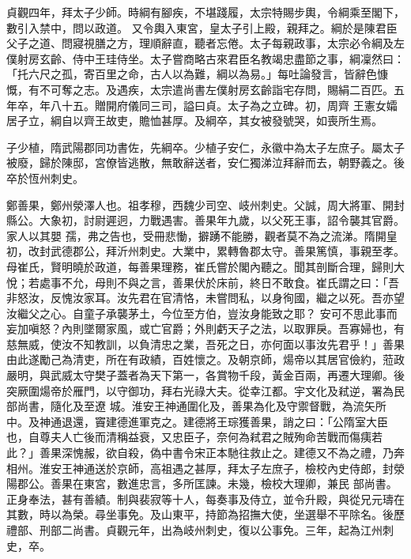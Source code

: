 \begin{pinyinscope}
 貞觀四年，拜太子少師。時綱有腳疾，不堪踐履，太宗特賜步輿，令綱乘至閣下，數引入禁中，問以政道。
 又令輿入東宮，皇太子引上殿，親拜之。綱於是陳君臣父子之道、問寢視膳之方，理順辭直，聽者忘倦。太子每親政事，太宗必令綱及左僕射房玄齡、侍中王珪侍坐。太子嘗商略古來君臣名教竭忠盡節之事，綱凜然曰：「托六尺之孤，寄百里之命，古人以為難，綱以為易。」每吐論發言，皆辭色慷慨，有不可奪之志。及遇疾，太宗遣尚書左僕射房玄齡詣宅存問，賜絹二百匹。五年卒，年八十五。贈開府儀同三司，謚曰貞。太子為之立碑。初，周齊
 王憲女孀居孑立，綱自以齊王故吏，贍恤甚厚。及綱卒，其女被發號哭，如喪所生焉。



 子少植，隋武陽郡同功書佐，先綱卒。少植子安仁，永徽中為太子左庶子。屬太子被廢，歸於陳邸，宮僚皆逃散，無敢辭送者，安仁獨涕泣拜辭而去，朝野義之。後卒於恆州刺史。



 鄭善果，鄭州滎澤人也。祖孝穆，西魏少司空、岐州刺史。父誠，周大將軍、開封縣公。大象初，討尉遲迥，力戰遇害。善果年九歲，以父死王事，詔令襲其官爵。家人以其嬰
 孺，弗之告也，受冊悲慟，擗踴不能勝，觀者莫不為之流涕。隋開皇初，改封武德郡公，拜沂州刺史。大業中，累轉魯郡太守。善果篤慎，事親至孝。母崔氏，賢明曉於政道，每善果理務，崔氏嘗於閣內聽之。聞其剖斷合理，歸則大悅；若處事不允，母則不與之言，善果伏於床前，終日不敢食。崔氏謂之曰：「吾非怒汝，反愧汝家耳。汝先君在官清恪，未嘗問私，以身徇國，繼之以死。吾亦望汝繼父之心。自童子承襲茅土，今位至方伯，豈汝身能致之耶？
 安可不思此事而妄加嗔怒？內則墜爾家風，或亡官爵；外則虧天子之法，以取罪戾。吾寡婦也，有慈無威，使汝不知教訓，以負清忠之業，吾死之日，亦何面以事汝先君乎！」善果由此遂勵己為清吏，所在有政績，百姓懷之。及朝京師，煬帝以其居官儉約，蒞政嚴明，與武威太守樊子蓋者為天下第一，各賞物千段，黃金百兩，再遷大理卿。後突厥圍煬帝於雁門，以守御功，拜右光祿大夫。從幸江都。宇文化及弒逆，署為民部尚書，隨化及至遼
 城。淮安王神通圍化及，善果為化及守禦督戰，為流矢所中。及神通退還，竇建德進軍克之。建德將王琮獲善果，誚之曰：「公隋室大臣也，自尊夫人亡後而清稱益衰，又忠臣子，奈何為弒君之賊殉命苦戰而傷痍若此？」善果深愧赧，欲自殺，偽中書令宋正本馳往救止之。建德又不為之禮，乃奔相州。淮安王神通送於京師，高祖遇之甚厚，拜太子左庶子，檢校內史侍郎，封滎陽郡公。善果在東宮，數進忠言，多所匡諫。未幾，檢校大理卿，兼民
 部尚書。正身奉法，甚有善績。制與裴寂等十人，每奏事及侍立，並令升殿，與從兄元璹在其數，時以為榮。尋坐事免。及山東平，持節為招撫大使，坐選舉不平除名。後歷禮部、刑部二尚書。貞觀元年，出為岐州刺史，復以公事免。三年，起為江州刺史，卒。




\end{pinyinscope}
